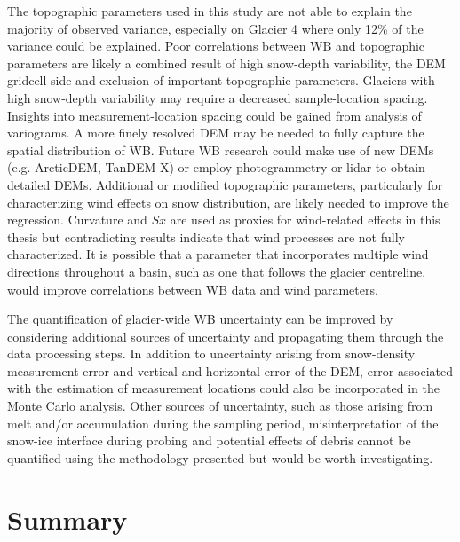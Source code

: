 \documentclass{sfuthesis}
\begin{document}
The topographic parameters used in this study are not able to explain the majority of observed variance, especially on Glacier 4 where only 12\% of the variance could be explained. Poor correlations between WB and topographic parameters are likely a combined result of high snow-depth variability, the DEM gridcell side and exclusion of important topographic parameters. Glaciers with high snow-depth variability may require a decreased sample-location spacing. Insights into measurement-location spacing could be gained from analysis of variograms. A more finely resolved DEM may be needed to fully capture the spatial distribution of WB. Future WB research could make use of new DEMs (e.g. ArcticDEM, TanDEM-X) or employ photogrammetry or lidar to obtain detailed DEMs. Additional or modified topographic parameters, particularly for characterizing wind effects on snow distribution, are likely needed to improve the regression. Curvature and $Sx$ are used as proxies for wind-related effects in this thesis but contradicting results indicate that wind processes are not fully characterized. It is possible that a parameter that incorporates multiple wind directions throughout a basin, such as one that follows the glacier centreline, would improve correlations between WB data and wind parameters. 

The quantification of glacier-wide WB uncertainty can be improved by considering additional sources of uncertainty and propagating them through the data processing steps. In addition to uncertainty arising from snow-density measurement error and vertical and horizontal error of the DEM, error associated with the estimation of measurement locations could also be incorporated in the Monte Carlo analysis. Other sources of uncertainty, such as those arising from melt and/or accumulation during the sampling period, misinterpretation of the snow-ice interface during probing and potential effects of debris cannot be quantified using the methodology presented but would be worth investigating. 

\section{Summary}
\end{document}
